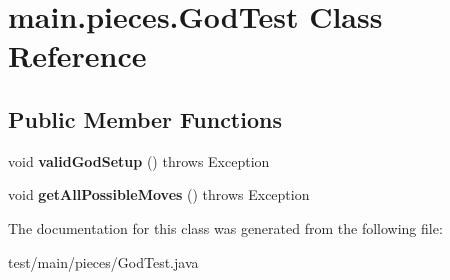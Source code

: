 \hypertarget{classmain_1_1pieces_1_1_god_test}{}\section{main.\+pieces.\+God\+Test Class Reference}
\label{classmain_1_1pieces_1_1_god_test}
\subsection*{Public Member Functions}
\begin{DoxyCompactItemize}
\item 
\mbox{\label{classmain_1_1pieces_1_1_god_test_aa4b61f98b986ca8e9b12121371af5b94}} 
void {\bfseries valid\+God\+Setup} ()  throws Exception 
\item 
\mbox{\label{classmain_1_1pieces_1_1_god_test_a242c88864ed13f044658265293cba548}} 
void {\bfseries get\+All\+Possible\+Moves} ()  throws Exception 
\end{DoxyCompactItemize}


The documentation for this class was generated from the following file\+:\begin{DoxyCompactItemize}
\item 
test/main/pieces/God\+Test.\+java\end{DoxyCompactItemize}
